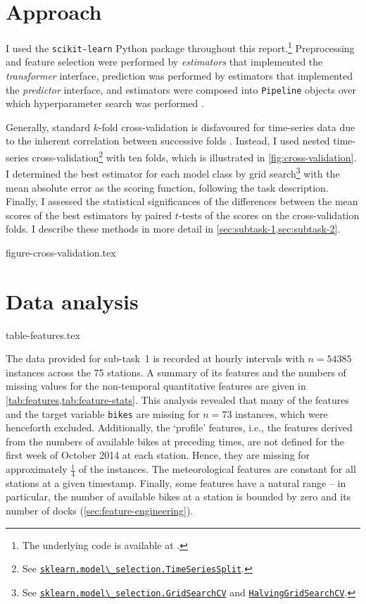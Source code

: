 \documentclass[11pt]{extarticle}
\newcommand{\sklearn}[2]{\href{https://scikit-learn.org/stable/modules/generated/sklearn.#1.#2.html}{\lstinline|sklearn.#1.#2|}}
\newcommand{\skl}[2]{\href{https://scikit-learn.org/stable/modules/generated/sklearn.#1.#2.html}{\lstinline|#2|}}
\begin{document}
\section{Approach}
\label{sec:approach}

I used the \texttt{scikit-learn} Python package \parencite{Pedregosa2011} throughout
this report.\footnote{The underlying code is available at
  .
}
Preprocessing and feature selection were performed by \emph{estimators} that
implemented the \emph{transformer} interface, prediction was performed by estimators
that implemented the \emph{predictor} interface, and estimators were composed into
\texttt{Pipeline} objects over which hyperparameter search was performed
\parencite[4-9]{Buitinck2013}.

Generally, standard $k$-fold cross-validation is disfavoured for time-series data due
to the inherent correlation between successive folds \parencite{Bergmeir2018}.
Instead, I used nested time-series cross-validation\footnote{See
  \sklearn{model\_selection}{TimeSeriesSplit}.
} with ten folds, which is illustrated in
\cref{fig:cross-validation}.
I determined the best estimator for each model class by grid search\footnote{See
  \sklearn{model\_selection}{GridSearchCV} and
  \skl{model\_selection}{HalvingGridSearchCV}.
} with the mean absolute error as the scoring function, following the task description.
Finally, I assessed the statistical significances of the differences between the mean
scores of the best estimators by paired $t$-tests of the scores on the cross-validation
folds.
I describe these methods in more detail in \cref{sec:subtask-1,sec:subtask-2}.

{figure-cross-validation.tex}

\section{Data analysis}
\label{sec:data-analysis}

{table-features.tex}

The data provided for sub-task~1 is recorded at hourly intervals with $n = 54385$
instances across the 75 stations.
A summary of its features and the numbers of missing values for the non-temporal
quantitative features are given in \cref{tab:features,tab:feature-stats}.
This analysis revealed that many of the features and the target variable \texttt{bikes}
are missing for $n = 73$ instances, which were henceforth excluded.
Additionally, the `profile' features, i.e., the features derived from the numbers of
available bikes at preceding times, are not defined for the first week of October 2014
at each station.
Hence, they are missing for approximately $\frac{1}{4}$ of the instances.
The meteorological features are constant for all stations at a given timestamp.
Finally, some features have a natural range -- in particular, the number of available
bikes at a station is bounded by zero and its number of docks
(\cref{sec:feature-engineering}).
\end{document}
